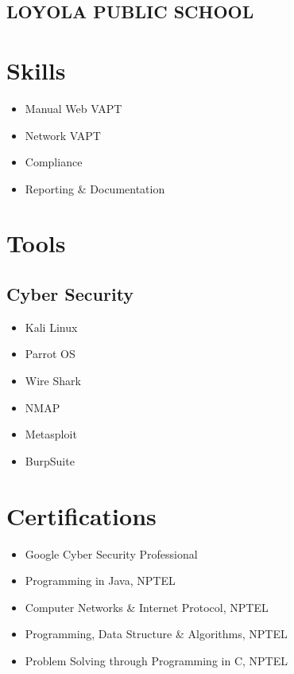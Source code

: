 \documentclass[]{roshan-resume}
\begin{document}
\begin{minipage}[t]{0.33\textwidth}
		\subsection{LOYOLA PUBLIC SCHOOL}
		
		
		
		
		\section{Skills}
		\begin{itemize}
			\item Manual Web VAPT \\ 
			\item Network VAPT \\
			\item Compliance \\
			\item Reporting \& Documentation	
		\end{itemize}
		
		
		\section{Tools}
		\subsection{Cyber Security}
		\begin{itemize}
			\item Kali Linux \\
			\item Parrot OS \\
			\item Wire Shark \\
			\item NMAP \\
			\item Metasploit \\
			\item BurpSuite
		\end{itemize}
		
		
		\section{Certifications}
		\begin{itemize}
			\item Google Cyber Security Professional
			\item Programming in Java, NPTEL
			\item Computer Networks \& Internet Protocol, NPTEL
			\item Programming, Data Structure \& Algorithms, NPTEL
			\item Problem Solving through Programming in C, NPTEL
		\end{itemize}
		

\end{minipage}
\end{document}
